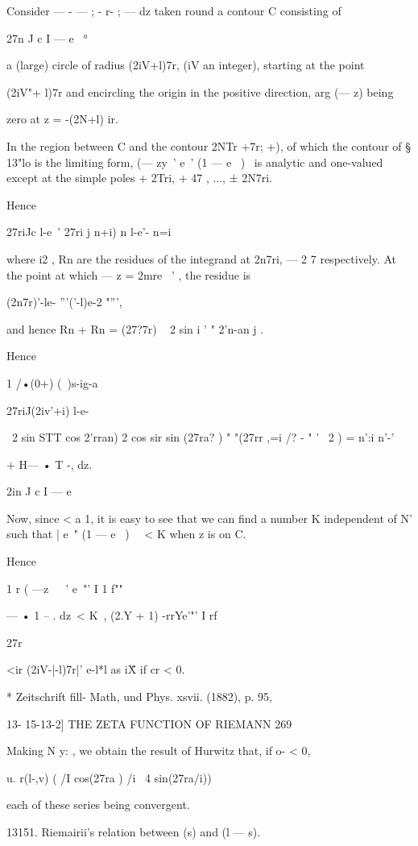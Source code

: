 Consider — - — ; - r- ; — dz taken round a contour C consisting of

27n J c I — e~ °

a (large) circle of radius (2iV+l)7r, (iV an integer), starting at the
point

(2iV"+ l)7r and encircling the origin in the positive direction, arg
(— z) being

zero at z = -(2N+l) ir.

In the region between C and the contour 2NTr +7r; +), of which the
contour of § 13"lo is the limiting form, (— zy~' e~' (1 — e~ )~ is
analytic and one-valued except at the simple poles + 2Tri, + 47 , ...,
± 2N7ri.

Hence

27riJc l-e~' 27ri j n+i) n l-e'- n=i

where i2 , Rn are the residues of the integrand at 2n7ri, — 2 7
respectively. At the point at which — z = 2mre~ ' , the residue is

(2n7r)'-le- '''('-l)e-2 "''',

and hence Rn + Rn = (27?7r) ~ 2 sin i ' " 2'n-an j .

Hence

1 /•(0+) (\ )s-ig-a

27riJ(2iv'+i) l-e-

\ 2 sin STT cos 2'rran) 2 cos sir sin (27ra? ) " "(27rr ,=i /? - " ' \
2 ) = n':i n'-'

+ H— • T -, dz.

2in J c I — e

Now, since < a 1, it is easy to see that we can find a number K
independent of N' such that | e~" (1 — e~ )~ \ < K when z is on C.

Hence

1 r ( —z\ \ ~' e~"' I 1 f""

— • 1 -- . dz\ < K\ , (2.Y + 1) -rrYe'"' I rf

27r

<ir (2iV-|-l)7r|' e-l*l as i\" X if cr < 0.

* Zeitschrift fill- Math, und Phys. xsvii. (1882), p. 95,

13- 15-13-2] THE ZETA FUNCTION OF RIEMANN 269

Making N y: , we obtain the result of Hurwitz that, if o- < 0,

 u. r(l-,v) ( /I cos(27ra ) /i \ 4 sin(27ra/i))

each of these series being convergent.

13151. Riemairii's relation between (s) and (l — s).

